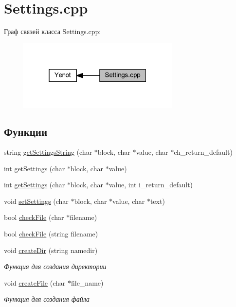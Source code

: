 \hypertarget{group__settingscpp}{}\section{Settings.\+cpp}
\label{group__settingscpp}
Граф связей класса Settings.\+cpp\+:
\nopagebreak
\begin{figure}[H]
\begin{center}
\leavevmode
\includegraphics[width=229pt]{group__settingscpp}
\end{center}
\end{figure}
\subsection*{Функции}
\begin{DoxyCompactItemize}
\item 
string \mbox{\hyperlink{group__settingscpp_ga50535cebf45c8d7cbffd29274699e5f5}{get\+Settings\+String}} (char $\ast$block, char $\ast$value, char $\ast$ch\+\_\+return\+\_\+default)
\item 
int \mbox{\hyperlink{group__settingscpp_ga68b4d9ed6be7aaa93d9a6fe8fd683862}{get\+Settings}} (char $\ast$block, char $\ast$value)
\item 
int \mbox{\hyperlink{group__settingscpp_ga0a2fe94de4037eda33c49fe332970891}{get\+Settings}} (char $\ast$block, char $\ast$value, int i\+\_\+return\+\_\+default)
\item 
void \mbox{\hyperlink{group__settingscpp_ga463e32ccb37f9478b0e62ee0d21c5999}{set\+Settings}} (char $\ast$block, char $\ast$value, char $\ast$text)
\item 
bool \mbox{\hyperlink{group__settingscpp_ga2dd1bc039652a0480c444957d416b6a6}{check\+File}} (char $\ast$filename)
\item 
bool \mbox{\hyperlink{group__settingscpp_ga64f8c9899c815dc180b2b564c0d05762}{check\+File}} (string filename)
\item 
void \mbox{\hyperlink{group__settingscpp_ga5ac0cd45ecb6e65e3ace40687d6ee8bc}{create\+Dir}} (string namedir)
\begin{DoxyCompactList}\small\item\em Функция для создания директории \end{DoxyCompactList}\item 
void \mbox{\hyperlink{group__settingscpp_ga8f34a2030acfb5567678ab2bba25f3c1}{create\+File}} (char $\ast$file\+\_\+name)
\begin{DoxyCompactList}\small\item\em Функция для создания файла \end{DoxyCompactList}\end{DoxyCompactItemize}


